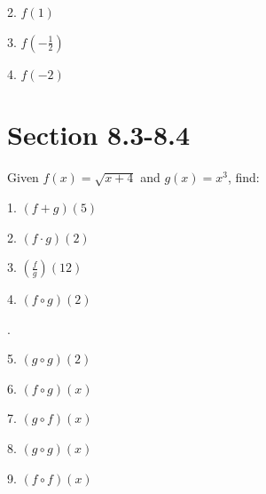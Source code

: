 \documentclass[12pt]{article}
\begin{document}
2. $f(1)$

\vspace{4.5em} 

3. $f\left(-\frac{1}{2} \right)$ 

\vspace{4.5em} 

4. $f(-2)$ 

\vspace{4.5em}
\section{Section 8.3-8.4}

\vspace{1.5em}
Given $f(x)=\sqrt{x+4}$ and $g(x)=x^3$, find: 

\vspace{1.5em} 

1. $(f+g)(5)$ 

\vspace{4.5em} 

2. $(f\cdot g)(2)$ 

\vspace{4.5em} 

3. $\left(\frac{f}{g} \right)(12)$ 

\vspace{4.5em} 

4. $(f\circ g)(2)$ 

\vspace{4.5em}. 

5. $(g\circ g)(2)$ 

\vspace{4.5em} 

6. $(f\circ g)(x)$

\vspace{4.5em} 

7. $(g\circ f)(x)$ 

\vspace{4.5em} 

8. $(g\circ g)(x)$ 

\vspace{4.5em} 

9. $(f\circ f)(x)$
\end{document}

